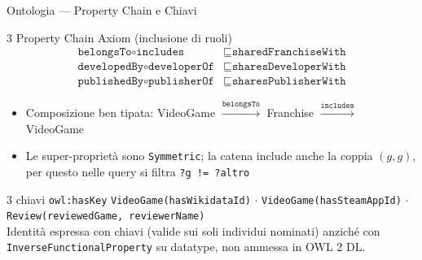 \documentclass[aspectratio=169,11pt]{beamer}
\begin{document}
\begin{frame}{Ontologia --- Property Chain e Chiavi}
  \begin{block}{3 Property Chain Axiom (inclusione di ruoli)}
    \small
    \vspace{-4pt}
    \begin{align*}
      \texttt{belongsTo} \circ \texttt{includes} &\sqsubseteq \texttt{sharedFranchiseWith} \\
      \texttt{developedBy} \circ \texttt{developerOf} &\sqsubseteq \texttt{sharesDeveloperWith} \\
      \texttt{publishedBy} \circ \texttt{publisherOf} &\sqsubseteq \texttt{sharesPublisherWith}
    \end{align*}
  \end{block}

  \begin{itemize}\small
    \item Composizione ben tipata: VideoGame $\xrightarrow{\texttt{belongsTo}}$ Franchise
      $\xrightarrow{\texttt{includes}}$ VideoGame
    \item Le super-propriet\`a sono \texttt{Symmetric}; la catena include anche la coppia
      $(g,g)$, per questo nelle query si filtra \texttt{?g != ?altro}
  \end{itemize}

  \begin{block}{3 chiavi \texttt{owl:hasKey}}
    \footnotesize
    \texttt{VideoGame(hasWikidataId)} $\cdot$
    \texttt{VideoGame(hasSteamAppId)} $\cdot$
    \texttt{Review(reviewedGame, reviewerName)} \\[2pt]
    Identit\`a espressa con chiavi (valide sui soli individui nominati) anzich\'e con
    \texttt{InverseFunctionalProperty} su datatype, non ammessa in OWL 2 DL.
  \end{block}
\end{frame}
\end{document}
